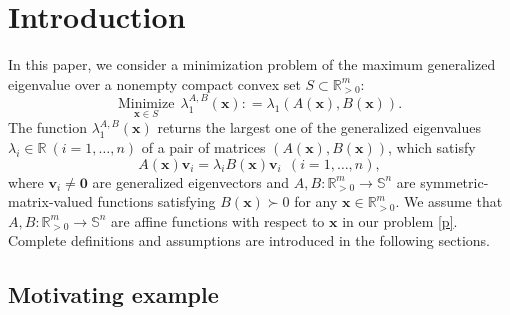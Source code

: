 \documentclass[sn-mathphys,Numbered]{sn-jnl}%
\theoremstyle{thmstyleone}%
\theoremstyle{thmstyletwo}%
\theoremstyle{thmstylethree}%
\newcommand{\e}[1]{\begin{equation}#1\end{equation}}
\def\coloneq{\mathrel{\mathop:}=}
\def\lamx{\lambda^{A,B}_1(\boldsymbol{x})}
\begin{document}



\maketitle

\section{Introduction}

In this paper, we consider a minimization problem of the maximum generalized eigenvalue over a nonempty compact convex set $S\subset\mathbb{R}^m_{>0}$:
\e{
\underset{\bm{x}\in S}{\mathrm{Minimize}}\ \ \lamx\coloneq\lambda_1 (A(\bm{x}),B(\bm{x})).
\label{p}
}
The function $\lamx$ returns the largest one of the generalized eigenvalues $\lambda_i\in\mathbb{R}\ (i=1,\ldots,n)$ of a pair of matrices $(A(\bm{x}),B(\bm{x}))$, which satisfy
\e{
A(\bm{x})\bm{v}_i=\lambda_i B(\bm{x})\bm{v}_i\ \ (i=1,\ldots,n),
}
where $\bm{v}_i\neq\bm{0}$ are generalized eigenvectors and $A,B:\mathbb{R}^m_{>0}\to\mathbb{S}^n$ are symmetric-matrix-valued functions satisfying $B(\bm{x})\succ0$ for any $\bm{x}\in\mathbb{R}^m_{>0}$. We assume that $A,B:\mathbb{R}^m_{>0}\to\mathbb{S}^n$ are affine functions with respect to $\bm{x}$ in our problem \eqref{p}. Complete definitions and assumptions are introduced in the following sections.

\subsection{Motivating example}
\end{document}

